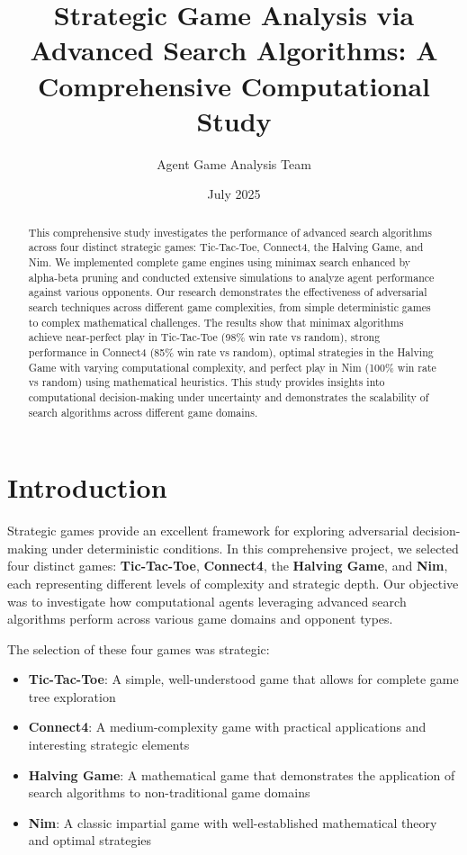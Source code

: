 \documentclass[12pt]{article}
\title{Strategic Game Analysis via Advanced Search Algorithms: A Comprehensive Computational Study}
\author{Agent Game Analysis Team}
\date{July 2025}
\begin{document}
\maketitle

\begin{abstract}
This comprehensive study investigates the performance of advanced search algorithms across four distinct strategic games: Tic-Tac-Toe, Connect4, the Halving Game, and Nim. We implemented complete game engines using minimax search enhanced by alpha-beta pruning and conducted extensive simulations to analyze agent performance against various opponents. Our research demonstrates the effectiveness of adversarial search techniques across different game complexities, from simple deterministic games to complex mathematical challenges. The results show that minimax algorithms achieve near-perfect play in Tic-Tac-Toe (98\% win rate vs random), strong performance in Connect4 (85\% win rate vs random), optimal strategies in the Halving Game with varying computational complexity, and perfect play in Nim (100\% win rate vs random) using mathematical heuristics. This study provides insights into computational decision-making under uncertainty and demonstrates the scalability of search algorithms across different game domains.
\end{abstract}

\section{Introduction}

Strategic games provide an excellent framework for exploring adversarial decision-making under deterministic conditions. In this comprehensive project, we selected four distinct games: \textbf{Tic-Tac-Toe}, \textbf{Connect4}, the \textbf{Halving Game}, and \textbf{Nim}, each representing different levels of complexity and strategic depth. Our objective was to investigate how computational agents leveraging advanced search algorithms perform across various game domains and opponent types.

The selection of these four games was strategic:
\begin{itemize}
    \item \textbf{Tic-Tac-Toe}: A simple, well-understood game that allows for complete game tree exploration
    \item \textbf{Connect4}: A medium-complexity game with practical applications and interesting strategic elements
    \item \textbf{Halving Game}: A mathematical game that demonstrates the application of search algorithms to non-traditional game domains
    \item \textbf{Nim}: A classic impartial game with well-established mathematical theory and optimal strategies
\end{itemize}
\end{document}
